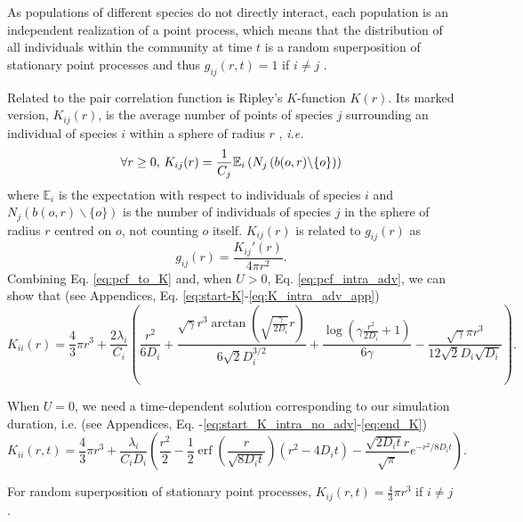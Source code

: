 \documentclass[english]{article}
\DeclareMathOperator\erf{erf}
\begin{document}
As populations of different species do not directly interact, each
population is an independent realization of a point process, which
means that the distribution of all individuals within the community
at time $t$ is a random superposition of stationary point processes
and thus $g_{ij}(r,t)=1$ if $i\neq j$ \citep[ p. 326, eq. 5.3.13]{illian2008statistical}.\medskip{}

Related to the pair correlation function is Ripley's $K$-function
$K(r)$. Its marked version, $K_{ij}(r)$, is the average number of
points of species $j$ surrounding an individual of species $i$ within
a sphere of radius $r$ \citep{illian2008statistical}, \textit{i.e.}
\begin{equation}
\forall r\geq0\textmd{, }K_{ij}(r)=\frac{1}{C_{j}}\mathbb{E}_{i}\left(N_{j}\left(b(o,r)\backslash\{o\}\right)\right)
\end{equation}
where $\mathbb{E}_{i}$ is the expectation with respect to individuals
of species $i$ and $N_{j}\left(b(o,r)\backslash\{o\}\right)$ is
the number of individuals of species $j$ in the sphere of radius
$r$ centred on $o$, not counting $o$ itself. $K_{ij}(r)$ is related
to $g_{ij}(r)$ as
\begin{equation}
g_{ij}(r)=\frac{K_{ij}'(r)}{4\pi r^{2}}.\label{eq:pcf_to_K}
\end{equation}
Combining Eq. \ref{eq:pcf_to_K} and, when $U>0$, Eq. \ref{eq:pcf_intra_adv},
we can show that (see Appendices, Eq. \ref{eq:start-K}-\ref{eq:K_intra_adv_app})
\begin{equation}
K_{ii}(r)=\frac{4}{3}\pi r^{3}+\frac{2\lambda_i}{C_{i}}\left(\frac{r^{2}}{6D_i}+\frac{\sqrt{\gamma}r^{3}\arctan(\sqrt{\frac{\gamma}{2D_i}}r)}{6\sqrt{2}D_i^{3/2}}+\frac{\log\left(\gamma\frac{r^{2}}{2D_i}+1\right)}{6\gamma}-\frac{\sqrt{\gamma}\pi r^{3}}{12\sqrt{2}D_i\sqrt{D_i}}\right).\label{eq:K_intra_adv}
\end{equation}

When $U=0$, we need a time-dependent solution corresponding to our
simulation duration, i.e. (see Appendices, Eq. -\ref{eq:start_K_intra_no_adv}-\ref{eq:end_K})
\begin{equation}
K_{ii}(r,t)=\frac{4}{3}\pi r^{3}+\frac{\lambda_i}{C_{i}D_i}\left(\frac{r^{2}}{2}-\frac{1}{2}\erf(\frac{r}{\sqrt{8D_i t}})(r^{2}-4D_i t)-\frac{\sqrt{2D_i t}r}{\sqrt{\pi}}e^{-r^{2}/8D_i t}\right).\label{eq:K_intra_no_adv}
\end{equation}

For random superposition of stationary point processes, $K_{ij}(r,t)=\frac{4}{3}\pi r^{3}$
if $i\neq j$ \citep[p. 324, eq. 5.3.5]{illian2008statistical}.
\end{document}
